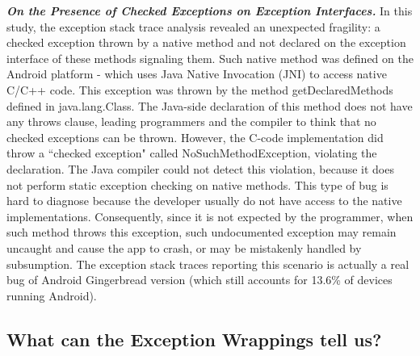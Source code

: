\documentclass[conference]{IEEEtran}
\begin{document}
\emph{\textbf{On the Presence of Checked Exceptions on Exception Interfaces.}} 
In this study, the exception stack trace analysis revealed an unexpected fragility: a 
checked exception thrown by a native method and not declared on the exception 
interface of these methods signaling them. Such native method was defined on
 the Android platform -  which uses Java Native Invocation (JNI) to access 
native C/C++ code. This exception was thrown by the method getDeclaredMethods defined in java.lang.Class. 
The Java-side declaration of this method does not have any throws clause, 
leading programmers and the compiler to think that no checked exceptions can be thrown.
 However, the C-code implementation did throw a ``checked exception" called NoSuchMethodException, 
violating the declaration. The Java compiler could not detect this violation, because it does 
not perform static exception checking on native methods. This type of bug is hard to diagnose
because the developer usually do not have access to the native implementations. 
Consequently, since it is not expected by the programmer, when such method throws 
this exception, such undocumented exception may remain
uncaught and cause the app to crash, or may be mistakenly handled by subsumption.
The exception stack traces reporting this scenario is actually a real bug of Android 
Gingerbread version (which still accounts for 13.6\% of devices running Android).

\noindent {}


\subsection{What can the Exception Wrappings tell us?}
\end{document}
